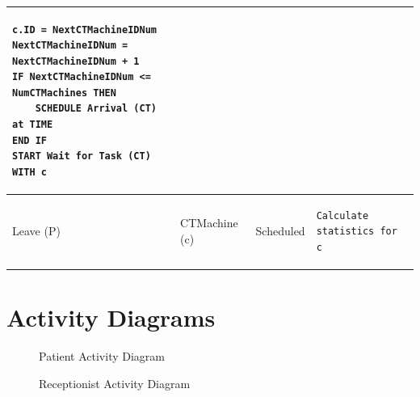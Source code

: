 \documentclass[
  10pt,
  a4paperpaper,
  DIV=11,
  numbers=noendperiod,
  oneside]{scrreprt}
\begin{document}
\begin{longtable}{@{}>{\raggedright\arraybackslash}p{1.5cm}>{\raggedright\arraybackslash}p{2.1cm}>{\raggedright\arraybackslash}p{2.2cm}>{\raggedright\arraybackslash}p{10cm}@{}}
  \begin{lstlisting}[language=CMPseudo]
c.ID = NextCTMachineIDNum
NextCTMachineIDNum = NextCTMachineIDNum + 1
IF NextCTMachineIDNum <= NumCTMachines THEN
    SCHEDULE Arrival (CT) at TIME
END IF
START Wait for Task (CT) WITH c
  \end{lstlisting}
  \\ \midrule
  Leave (P) & CTMachine (c)  & Scheduled  & 
  \vspace{-12pt}
  \begin{lstlisting}[language=CMPseudo]
Calculate statistics for c
  \end{lstlisting}
  \\ \bottomrule
  

\end{longtable}

\newpage{}

\section{Activity Diagrams}\label{activity-diagrams}

\begin{figure}[htbp]


\caption{\label{fig-pat_act}Patient Activity Diagram}

\end{figure}%

\begin{figure}[htbp]


\caption{\label{fig-recep_act}Receptionist Activity Diagram}

\end{figure}%
\end{document}
